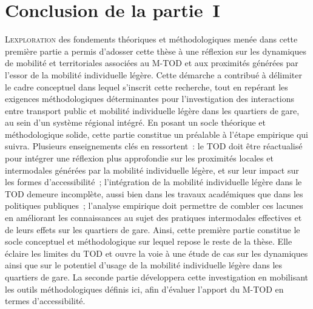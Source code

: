 
\cleardoublepage
\section*{Conclusion de la partie~I
    \label{part1:conclusion}
    }

\lettrine[lines=3, findent=8pt, nindent=0pt]{ L}{exploration} des fondements théoriques et méthodologiques menée dans cette première partie a permis d’adosser cette thèse à une réflexion sur les dynamiques de mobilité et territoriales associées au \acrshort{M-TOD} et aux proximités générées par l'essor de la mobilité individuelle légère. Cette démarche a contribué à délimiter le cadre conceptuel dans lequel s’inscrit cette recherche, tout en repérant les exigences méthodologiques déterminantes pour l'investigation des interactions entre transport public et mobilité individuelle légère dans les quartiers de gare, au sein d'un système régional intégré. En posant un socle théorique et méthodologique solide, cette partie constitue un préalable à l'étape empirique qui suivra. Plusieurs enseignements clés en ressortent~: le \acrshort{TOD} doit être réactualisé pour intégrer une réflexion plus approfondie sur les proximités locales et intermodales générées par la mobilité individuelle légère, et sur leur impact sur les formes d’accessibilité~; l’intégration de la mobilité individuelle légère dans le \acrshort{TOD} demeure incomplète, aussi bien dans les travaux académiques que dans les politiques publiques~; l’analyse empirique doit permettre de combler ces lacunes en améliorant les connaissances au sujet des pratiques intermodales effectives et de leurs effets sur les quartiers de gare. Ainsi, cette première partie constitue le socle conceptuel et méthodologique sur lequel repose le reste de la thèse. Elle éclaire les limites du \acrshort{TOD} et ouvre la voie à une étude de cas sur les dynamiques ainsi que sur le potentiel d'usage de la mobilité individuelle légère dans les quartiers de gare. La seconde partie développera cette investigation en mobilisant les outils méthodologiques définis ici, afin d'évaluer l'apport du \acrshort{M-TOD} en termes d'accessibilité.%